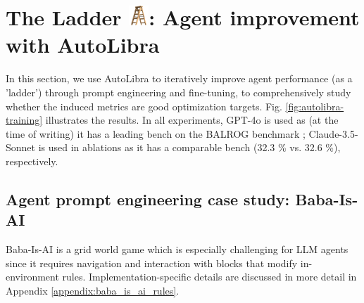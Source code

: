 \section{The Ladder \protect\includegraphics[height=1em]{figs/ladder.png}: Agent improvement with AutoLibra}
\label{sec:ladder}

In this section, we use AutoLibra to iteratively improve agent performance (as a 'ladder') through prompt engineering and fine-tuning, to comprehensively study whether the induced metrics are good optimization targets. 
Fig. \ref{fig:autolibra-training} illustrates the results. In all experiments, GPT-4o is used as (at the time of writing) it has a leading bench on the BALROG benchmark \cite{paglieri2024balrog}; Claude-3.5-Sonnet is used in ablations as it has a comparable bench (32.3 \% vs. 32.6 \%), respectively.

\subsection{Agent prompt engineering case study: Baba-Is-AI}
\label{sec:Baba-Is-AI}

Baba-Is-AI \citep{cloos2024babaaibreakrules} is a grid world game which is especially challenging for LLM agents since it requires navigation and interaction with blocks that modify in-environment rules. Implementation-specific details are discussed in more detail in Appendix \ref{appendix:baba_is_ai_rules}.



